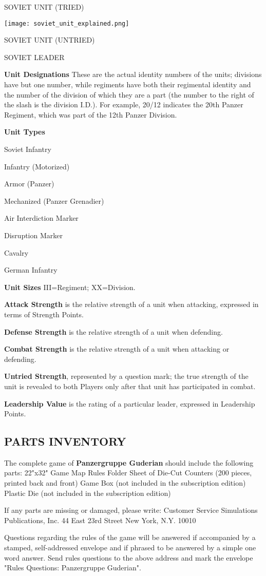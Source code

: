 SOVIET UNIT (TRIED)

\begin{center}
  \texttt{[image: soviet\_unit\_explained.png]}
\end{center}

SOVIET UNIT (UNTRIED)

SOVIET LEADER

\textbf{Unit Designations}
These are the actual identity numbers of the units; divisions have but one number, while regiments have both their regimental identity and the number of the division of which they are a part (the number to the right of the slash is the division I.D.). For example, 20/12 indicates the 20th Panzer Regiment, which was part of the 12th Panzer Division.

\textbf{Unit Types}

Soviet Infantry

Infantry (Motorized)

Armor (Panzer)

Mechanized (Panzer Grenadier)

Air Interdiction Marker

Disruption Marker

Cavalry

German Infantry

\textbf{Unit Sizes}
III=Regiment; XX=Division.

\textbf{Attack Strength} is the relative strength of a unit when attacking, expressed in terms of Strength Points.

\textbf{Defense Strength} is the relative strength of a unit when defending.

\textbf{Combat Strength} is the relative strength of a unit when attacking or defending.

\textbf{Untried Strength}, represented by a question mark; the true strength of the unit is revealed to both Players only after that unit has participated in combat.

\textbf{Leadership Value} is the rating of a particular leader, expressed in Leadership Points.

\subsection{PARTS INVENTORY}

The complete game of \textbf{Panzergruppe Guderian} should include the following parts:
22"x32" Game Map
Rules Folder
Sheet of Die-Cut Counters (200 pieces, printed back and front)
Game Box (not included in the subscription edition)
Plastic Die (not included in the subscription edition)

If any parts are missing or damaged, please write:
Customer Service
Simulations Publications, Inc.
44 East 23rd Street
New York, N.Y. 10010

Questions regarding the rules of the game will be answered if accompanied by a stamped, self-addressed envelope and if phrased to be answered by a simple one word answer. Send rules questions to the above address and mark the envelope "Rules Questions: Panzergruppe Guderian".